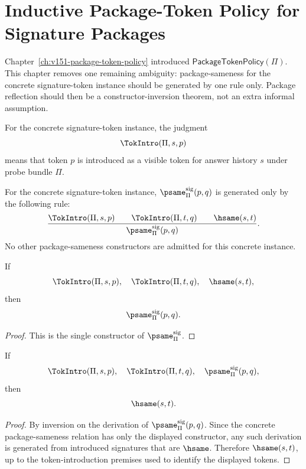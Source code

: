 
\chapter{Inductive Package-Token Policy for Signature Packages}
\label{ch:v152-inductive-package-token-policy}

Chapter~\ref{ch:v151-package-token-policy} introduced \(\mathsf{PackageTokenPolicy}(\Pi)\). This chapter removes one remaining ambiguity: package-sameness for the concrete signature-token instance should be generated by one rule only. Package reflection should then be a constructor-inversion theorem, not an extra informal assumption.

\begin{definition}
For the concrete signature-token instance, the judgment
\[
  \TokIntro(\Pi,s,p)
\]
means that token \(p\) is introduced as a visible token for answer history \(s\) under probe bundle \(\Pi\).
\end{definition}

\begin{definition}
For the concrete signature-token instance, \(\psame_{\Pi}^{\mathrm{sig}}(p,q)\) is generated only by the following rule:
\[
\frac{
  \TokIntro(\Pi,s,p)
  \qquad
  \TokIntro(\Pi,t,q)
  \qquad
  \hsame(s,t)
}{
  \psame_{\Pi}^{\mathrm{sig}}(p,q)
}.
\]
No other package-sameness constructors are admitted for this concrete instance.
\end{definition}

\begin{lemma}
\label{lem:v152-psame-sound}
If
\[
  \TokIntro(\Pi,s,p),\quad \TokIntro(\Pi,t,q),\quad \hsame(s,t),
\]
then
\[
  \psame_{\Pi}^{\mathrm{sig}}(p,q).
\]
\end{lemma}

\begin{proof}
This is the single constructor of \(\psame_{\Pi}^{\mathrm{sig}}\).
\end{proof}

\begin{lemma}
\label{lem:v152-psame-reflect}
If
\[
  \TokIntro(\Pi,s,p),\quad \TokIntro(\Pi,t,q),\quad
  \psame_{\Pi}^{\mathrm{sig}}(p,q),
\]
then
\[
  \hsame(s,t).
\]
\end{lemma}

\begin{proof}
By inversion on the derivation of \(\psame_{\Pi}^{\mathrm{sig}}(p,q)\). Since the concrete package-sameness relation has only the displayed constructor, any such derivation is generated from introduced signatures that are \(\hsame\). Therefore \(\hsame(s,t)\), up to the token-introduction premises used to identify the displayed tokens.
\end{proof}

